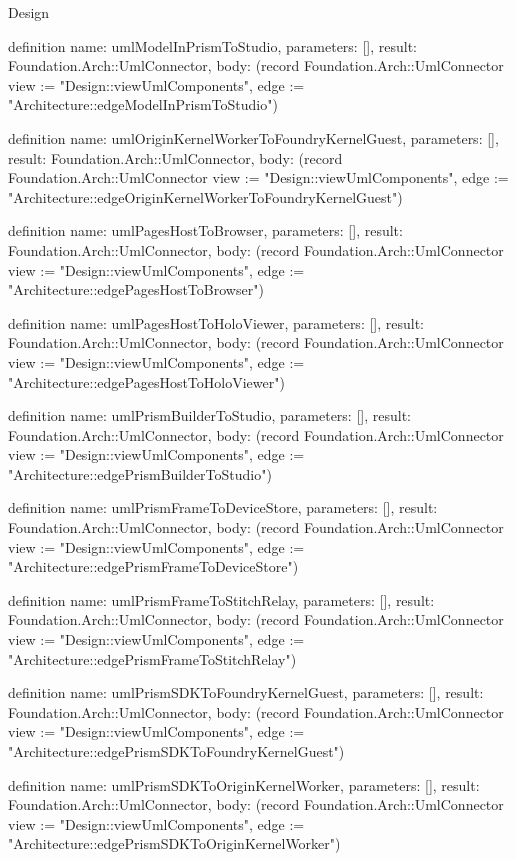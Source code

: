 \begin{lexlean}{Design}
\begin{semanticmodule}
definition{
  name: umlModelInPrismToStudio,
  parameters: [],
  result: Foundation.Arch::UmlConnector,
  body: (record Foundation.Arch::UmlConnector {view := "Design::viewUmlComponents", edge := "Architecture::edgeModelInPrismToStudio"})
}

definition{
  name: umlOriginKernelWorkerToFoundryKernelGuest,
  parameters: [],
  result: Foundation.Arch::UmlConnector,
  body: (record Foundation.Arch::UmlConnector {view := "Design::viewUmlComponents", edge := "Architecture::edgeOriginKernelWorkerToFoundryKernelGuest"})
}

definition{
  name: umlPagesHostToBrowser,
  parameters: [],
  result: Foundation.Arch::UmlConnector,
  body: (record Foundation.Arch::UmlConnector {view := "Design::viewUmlComponents", edge := "Architecture::edgePagesHostToBrowser"})
}

definition{
  name: umlPagesHostToHoloViewer,
  parameters: [],
  result: Foundation.Arch::UmlConnector,
  body: (record Foundation.Arch::UmlConnector {view := "Design::viewUmlComponents", edge := "Architecture::edgePagesHostToHoloViewer"})
}

definition{
  name: umlPrismBuilderToStudio,
  parameters: [],
  result: Foundation.Arch::UmlConnector,
  body: (record Foundation.Arch::UmlConnector {view := "Design::viewUmlComponents", edge := "Architecture::edgePrismBuilderToStudio"})
}

definition{
  name: umlPrismFrameToDeviceStore,
  parameters: [],
  result: Foundation.Arch::UmlConnector,
  body: (record Foundation.Arch::UmlConnector {view := "Design::viewUmlComponents", edge := "Architecture::edgePrismFrameToDeviceStore"})
}

definition{
  name: umlPrismFrameToStitchRelay,
  parameters: [],
  result: Foundation.Arch::UmlConnector,
  body: (record Foundation.Arch::UmlConnector {view := "Design::viewUmlComponents", edge := "Architecture::edgePrismFrameToStitchRelay"})
}

definition{
  name: umlPrismSDKToFoundryKernelGuest,
  parameters: [],
  result: Foundation.Arch::UmlConnector,
  body: (record Foundation.Arch::UmlConnector {view := "Design::viewUmlComponents", edge := "Architecture::edgePrismSDKToFoundryKernelGuest"})
}

definition{
  name: umlPrismSDKToOriginKernelWorker,
  parameters: [],
  result: Foundation.Arch::UmlConnector,
  body: (record Foundation.Arch::UmlConnector {view := "Design::viewUmlComponents", edge := "Architecture::edgePrismSDKToOriginKernelWorker"})
}


\end{semanticmodule}
\end{lexlean}
